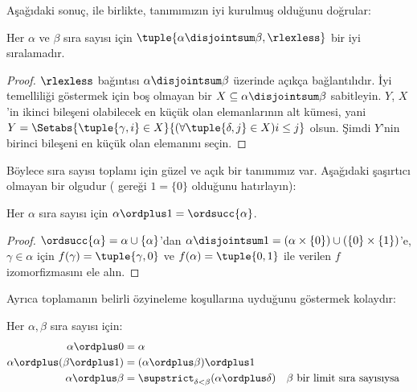 \documentclass[../../../include/open-logic-section]{subfiles}
\begin{document}
Aşağıdaki sonuç,
 ile birlikte,
tanımımızın iyi kurulmuş olduğunu doğrular:

\begin{lem}
Her $\alpha$ ve $\beta$ sıra sayısı için
$\tuple{\alpha\disjointsum\beta,\rlexless}$ bir iyi sıralamadır.
\end{lem}

\begin{proof}
$\rlexless$ bağıntısı $\alpha\disjointsum\beta$ üzerinde açıkça
bağlantılıdır. İyi temelliliği göstermek için boş olmayan bir
$X\subseteq\alpha\disjointsum\beta$ sabitleyin. $Y$, $X$'in ikinci
bileşeni olabilecek en küçük olan elemanlarının alt kümesi, yani
$Y=\Setabs{\tuple{\gamma,i}\in X}{(\forall\tuple{\delta,j}\in X)i\leq j}$
olsun. Şimdi $Y$'nin birinci bileşeni en küçük olan elemanını seçin.
\end{proof}
\noindent
Böylece sıra sayısı toplamı için güzel ve açık bir tanımımız var. Aşağıdaki
şaşırtıcı olmayan bir olgudur
( gereği $1=\{0\}$ olduğunu hatırlayın):
\begin{prop}
Her $\alpha$ sıra sayısı için $\alpha\ordplus 1=\ordsucc{\alpha}$.
\end{prop}

\begin{proof}
$\ordsucc{\alpha}=\alpha\cup\{\alpha\}$'dan
$\alpha\disjointsum1=(\alpha\times\{0\})\cup(\{0\}\times\{1\})$'e,
$\gamma\in\alpha$ için $f(\gamma)=\tuple{\gamma,0}$ ve
$f(\alpha)=\tuple{0,1}$ ile verilen $f$ izomorfizmasını ele alın.
\end{proof}
\noindent
Ayrıca toplamanın belirli özyineleme koşullarına uyduğunu göstermek kolaydır:

\begin{lem}
Her $\alpha,\beta$ sıra sayısı için:
\begin{align*}
	\alpha\ordplus 0 &= \alpha\\
	\alpha \ordplus (\beta\ordplus 1) &= (\alpha\ordplus\beta)\ordplus 1\\
	\alpha\ordplus\beta &= \supstrict_{\delta < \beta}(\alpha\ordplus\delta) && \text{$\beta$ bir limit sıra sayısıysa}
\end{align*}
\end{lem}
\end{document}
